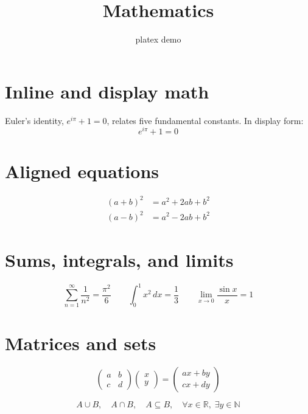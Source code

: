 \documentclass{article}
\title{Mathematics}
\author{platex demo}
\date{}
\begin{document}
\maketitle

\section{Inline and display math}
Euler's identity, $e^{i\pi} + 1 = 0$, relates five fundamental constants.
In display form:
\[
  e^{i\pi} + 1 = 0
\]

\section{Aligned equations}
\begin{align}
  (a + b)^2 &= a^2 + 2ab + b^2 \\
  (a - b)^2 &= a^2 - 2ab + b^2
\end{align}

\section{Sums, integrals, and limits}
\[
  \sum_{n=1}^{\infty} \frac{1}{n^2} = \frac{\pi^2}{6}
  \qquad
  \int_0^1 x^2 \, dx = \frac{1}{3}
  \qquad
  \lim_{x \to 0} \frac{\sin x}{x} = 1
\]

\section{Matrices and sets}
\[
  \begin{pmatrix} a & b \\ c & d \end{pmatrix}
  \begin{pmatrix} x \\ y \end{pmatrix}
  =
  \begin{pmatrix} ax + by \\ cx + dy \end{pmatrix}
\]

\[
  A \cup B, \quad A \cap B, \quad A \subseteq B, \quad \forall x \in \mathbb{R}, \; \exists y \in \mathbb{N}
\]
\end{document}

